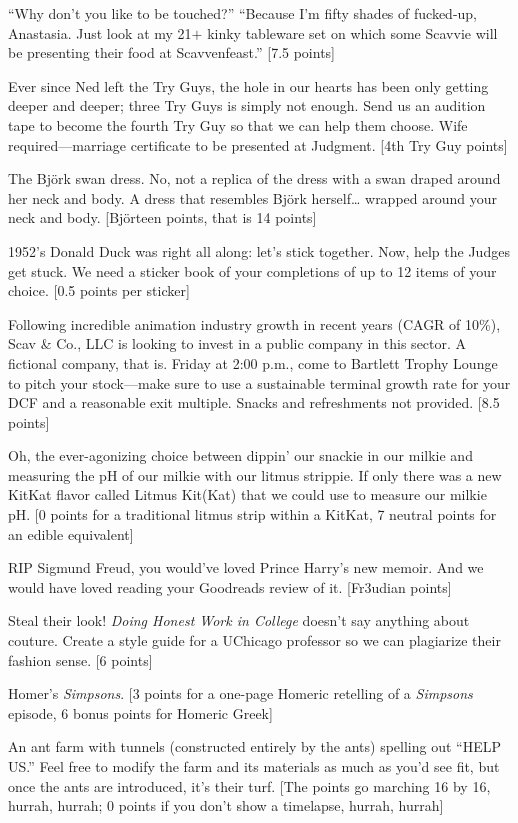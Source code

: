 \documentclass{book}
\begin{document}
\begin{list}{}{}
\item “Why don't you like to be touched?” “Because I'm fifty shades of fucked-up, Anastasia. Just look at my 21$+$ kinky tableware set on which some Scavvie will be presenting their food at Scavvenfeast.” [7.5 points]
\item Ever since Ned left the Try Guys, the hole in our hearts has been only getting deeper and deeper; three Try Guys is simply not enough. Send us an audition tape to become the fourth Try Guy so that we can help them choose. Wife required---marriage certificate to be presented at Judgment. [4th Try Guy points]
\item The Björk swan dress. No, not a replica of the dress with a swan draped around her neck and body. A dress that resembles Björk herself… wrapped around your neck and body. [Björteen points, that is 14 points]
\item 1952’s Donald Duck was right all along: let’s stick together. Now, help the Judges get stuck. We need a sticker book of your completions of up to 12 items of your choice. [0.5 points per sticker]
\item Following incredible animation industry growth in recent years (CAGR of 10\%), Scav \& Co., LLC is looking to invest in a public company in this sector. A fictional company, that is. Friday at 2:00 p.m., come to Bartlett Trophy Lounge to pitch your stock---make sure to use a sustainable terminal growth rate for your DCF and a reasonable exit multiple. Snacks and refreshments not provided. [8.5 points]
\item Oh, the ever-agonizing choice between dippin’ our snackie in our milkie and measuring the pH of our milkie with our litmus strippie. If only there was a new KitKat flavor called Litmus Kit(Kat) that we could use to measure our milkie pH. [0 points for a traditional litmus strip within a KitKat, 7 neutral points for an edible equivalent]
\item RIP Sigmund Freud, you would’ve loved Prince Harry’s new memoir. And we would have loved reading your Goodreads review of it. [Fr3udian points]
\item  Steal their look! \textit{Doing Honest Work in College} doesn’t say anything about couture. Create a style guide for a UChicago professor so we can plagiarize their fashion sense. [6 points]
\item Homer's \textit{Simpsons}. [3 points for a one-page Homeric retelling of a \textit{Simpsons} episode, 6 bonus points for Homeric Greek]
\item An ant farm with tunnels (constructed entirely by the ants) spelling out “HELP US.” Feel free to modify the farm and its materials as much as you’d see fit, but once the ants are introduced, it’s their turf. [The points go marching 16 by 16, hurrah, hurrah; 0 points if you don’t show a timelapse, hurrah, hurrah]

\end{list}
\end{document}
